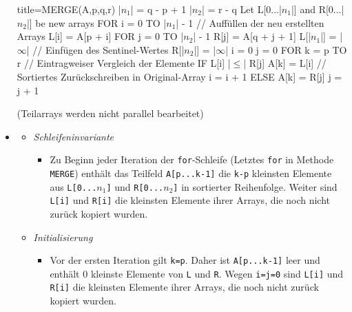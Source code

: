 \documentclass[
    ngerman,
    color=3b,
    load_common, %
    summary,
    boxarc,
]{tuda_summary}
\begin{document}
\begin{itemize}
          \begin{codeBlock}[autogobble,escapeinside=||]{title={MERGE(A,p,q,r)}}
              |$n_1$| = q - p + 1
              |$n_2$| = r - q
              Let L[0...|$n_1$|] and R[0...|$n_2$|] be new arrays
              FOR i = 0 TO |$n_1$| - 1 // Auffüllen der neu erstellten Arrays
                L[i] = A[p + i]
              FOR j = 0 TO |$n_2$| - 1
                R[j] = A[q + j + 1]
              L[|$n_1$|] = |$\infty$| // Einfügen des Sentinel-Wertes
              R[|$n_2$|] = |$\infty$|
              i = 0
              j = 0
              FOR k = p TO r  // Eintragweiser Vergleich der Elemente
                IF L[i] |$\leq$| R[j]
                    A[k] = L[i] // Sortiertes Zurückschreiben in Original-Array
                    i = i + 1
                ELSE
                    A[k] = R[j]
                    j = j + 1
          \end{codeBlock}
          (Teilarrays werden nicht parallel bearbeitet)
    \item {}
          \begin{itemize}
              \item \textit{Schleifeninvariante}
                    \begin{itemize}
                        \item[]
                              Zu Beginn jeder Iteration der \texttt{for}-Schleife (Letztes \texttt{for} in Methode \texttt{MERGE}) enthält
                              das Teilfeld \texttt{A[p...k-1]} die \texttt{k-p} kleinsten Elemente aus \texttt{L[0...$n_1$]} und \texttt{R[0...$n_2$]}
                              in sortierter Reihenfolge. Weiter sind \texttt{L[i]} und \texttt{R[i]} die kleinsten Elemente ihrer Arrays, die noch nicht
                              zurück kopiert wurden.
                    \end{itemize}
              \item \textit{Initialisierung}
                    \begin{itemize}
                        \item[]
                              Vor der ersten Iteration gilt \texttt{k=p}. Daher ist \texttt{A[p...k-1]} leer und enthält 0 kleinste Elemente von
                              \texttt{L} und \texttt{R}. Wegen \texttt{i=j=0} sind \texttt{L[i]} und \texttt{R[i]} die kleinsten Elemente ihrer
                              Arrays, die noch nicht zurück kopiert wurden.

\end{itemize}
\end{itemize}
\end{itemize}
\end{document}
